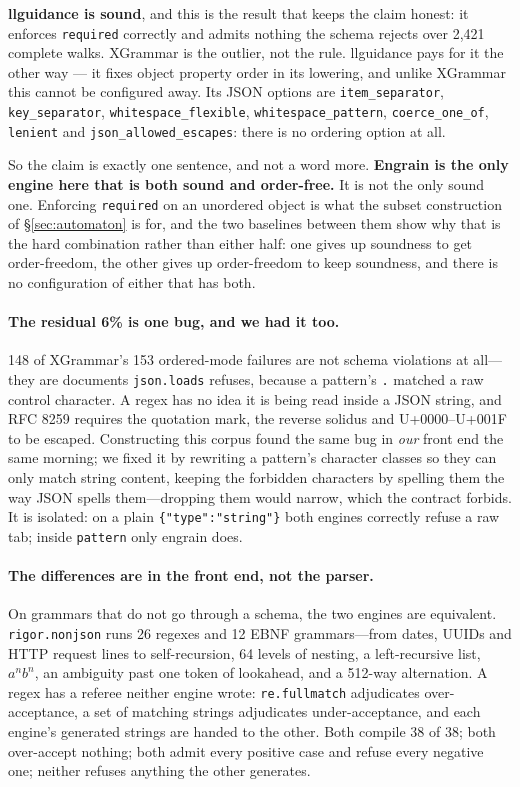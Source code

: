 \documentclass{article}
\begin{document}
\textbf{llguidance is sound}, and this is the result that keeps the claim
honest: it enforces \texttt{required} correctly and admits nothing the schema
rejects over 2{,}421 complete walks. XGrammar is the outlier, not the rule.
llguidance pays for it the other way --- it fixes object property order in its
lowering, and unlike XGrammar this cannot be configured away. Its JSON options
are \texttt{item\_separator}, \texttt{key\_separator},
\texttt{whitespace\_flexible}, \texttt{whitespace\_pattern},
\texttt{coerce\_one\_of}, \texttt{lenient} and
\texttt{json\_allowed\_escapes}: there is no ordering option at all.

So the claim is exactly one sentence, and not a word more. \textbf{Engrain is
the only engine here that is both sound and order-free.} It is not the only
sound one. Enforcing \texttt{required} on an unordered object is what the
subset construction of \S\ref{sec:automaton} is for, and the two baselines
between them show why that is the hard combination rather than either half:
one gives up soundness to get order-freedom, the other gives up order-freedom
to keep soundness, and there is no configuration of either that has both.

\paragraph{The residual 6\% is one bug, and we had it too.} 148 of XGrammar's
153 ordered-mode failures are not schema violations at all---they are documents
\texttt{json.loads} refuses, because a pattern's \verb|.| matched a raw control
character. A regex has no idea it is being read inside a JSON string, and
RFC 8259 requires the quotation mark, the reverse solidus and U+0000--U+001F to
be escaped. Constructing this corpus found the same bug in \emph{our} front end
the same morning; we fixed it by rewriting a pattern's character classes so
they can only match string content, keeping the forbidden characters by
spelling them the way JSON spells them---dropping them would narrow, which the
contract forbids. It is isolated: on a plain \verb|{"type":"string"}| both
engines correctly refuse a raw tab; inside \verb|pattern| only engrain does.

\paragraph{The differences are in the front end, not the parser.} On grammars
that do not go through a schema, the two engines are equivalent.
\texttt{rigor.nonjson} runs 26 regexes and 12 EBNF grammars---from dates,
UUIDs and HTTP request lines to self-recursion, 64 levels of nesting, a
left-recursive list, $a^n b^n$, an ambiguity past one token of lookahead, and a
512-way alternation. A regex has a referee neither engine wrote:
\texttt{re.fullmatch} adjudicates over-acceptance, a set of matching strings
adjudicates under-acceptance, and each engine's generated strings are handed to
the other. Both compile 38 of 38; both over-accept nothing; both admit every
positive case and refuse every negative one; neither refuses anything the other
generates.
\end{document}
